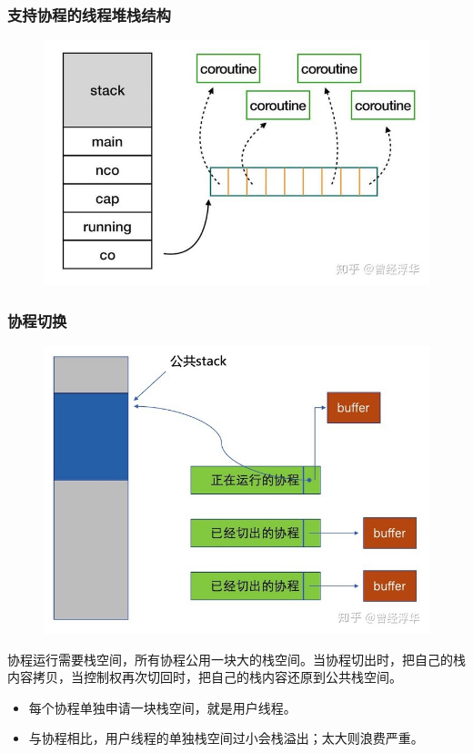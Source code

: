 \begin{frame}[fragile]
    \frametitle{支持协程的线程堆栈结构}
% 
	\begin{figure}
		\centering
		\includegraphics[width=0.75\linewidth]{figs/coroutine-memlayout.jpg}
  \end{figure}



% 

\end{frame}
\begin{frame}[fragile]
    \frametitle{协程切换}
% 
	\begin{figure}
		\centering
		\includegraphics[width=0.4\linewidth]{figs/coroutine-stack.jpg}
  \end{figure}



% 
协程运行需要栈空间，所有协程公用一块大的栈空间。当协程切出时，把自己的栈内容拷贝，当控制权再次切回时，把自己的栈内容还原到公共栈空间。

    \begin{itemize}
        \item 每个协程单独申请一块栈空间，就是用户线程。
        \item 与协程相比，用户线程的单独栈空间过小会栈溢出；太大则浪费严重。 
    \end{itemize}
\end{frame}
